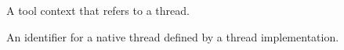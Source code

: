 \glossarydefstart
A tool context that refers to a thread.
\glossarydefend

\glossarydefstart
An identifier for a native thread defined by a thread implementation.
\glossarydefend

